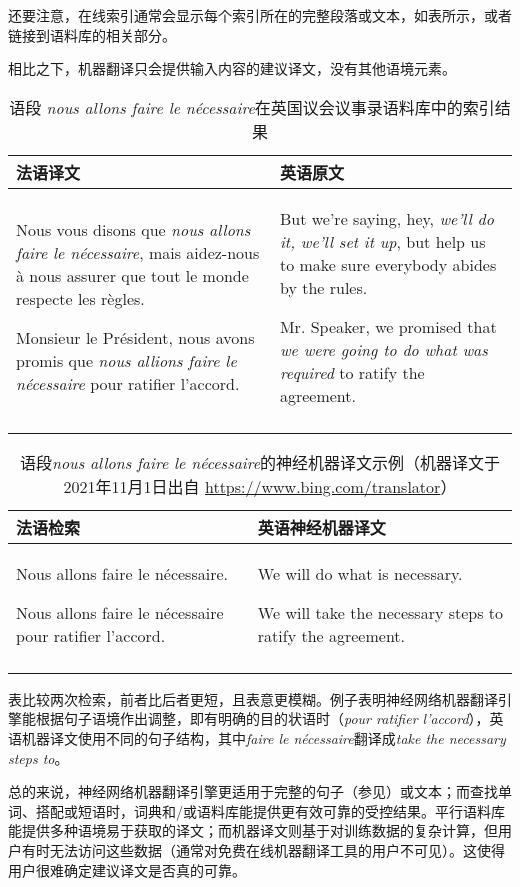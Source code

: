 \documentclass[output=paper,colorlinks,citecolor=brown]{langscibook}
\begin{document}
还要注意，在线索引通常会显示每个索引所在的完整段落或文本，如表所示，或者链接到语料库的相关部分。

相比之下，机器翻译只会提供输入内容的建议译文，没有其他语境元素。

\begin{table}
\begin{tabularx}{\textwidth}{QQ}
\lsptoprule
{法语译文} & {英语原文}\\
\midrule
Nous vous disons que \textit{nous allons faire le nécessaire}, mais aidez-nous à nous assurer que tout le monde respecte les règles.

Monsieur le Président, nous avons promis que \textit{nous allions faire le nécessaire} pour ratifier l'accord. & But we're saying, hey, \textit{we'll do it, we'll set it up}, but help us to make sure everybody abides by the rules.

Mr. Speaker, we promised that \textit{we were going to do what was required} to ratify the agreement.\\
\lspbottomrule
\end{tabularx}
\caption{语段 \textit{nous allons faire le nécessaire}在英国议会议事录语料库中的索引结果\label{tab:carre:2}}
\end{table}

\begin{table}
\begin{tabularx}{\textwidth}{QQ}
\lsptoprule
{法语检索} & {英语神经机器译文}\\
\midrule
Nous allons faire le nécessaire.

Nous allons faire le nécessaire pour ratifier l’accord. & We will do what is necessary.

We will take the necessary steps to ratify the agreement.\\
\lspbottomrule
\end{tabularx}
\caption{语段\textit{nous allons faire le nécessaire}的神经机器译文示例（机器译文于2021年11月1日出自 \url{https://www.bing.com/translator}）}
\label{tab:carre:3}
\end{table}

表比较两次检索，前者比后者更短，且表意更模糊。例子表明神经网络机器翻译引擎能根据句子语境作出调整，即有明确的目的状语时（\textit{pour ratifier l’accord}），英语机器译文使用不同的句子结构，其中\textit{faire le nécessaire}翻译成\textit{take the necessary steps to}。

总的来说，神经网络机器翻译引擎更适用于完整的句子（参见）或文本；而查找单词、搭配或短语时，词典和/或语料库能提供更有效可靠的受控结果。平行语料库能提供多种语境易于获取的译文；而机器译文则基于对训练数据的复杂计算，但用户有时无法访问这些数据（通常对免费在线机器翻译工具的用户不可见）。这使得用户很难确定建议译文是否真的可靠。
\end{document}
